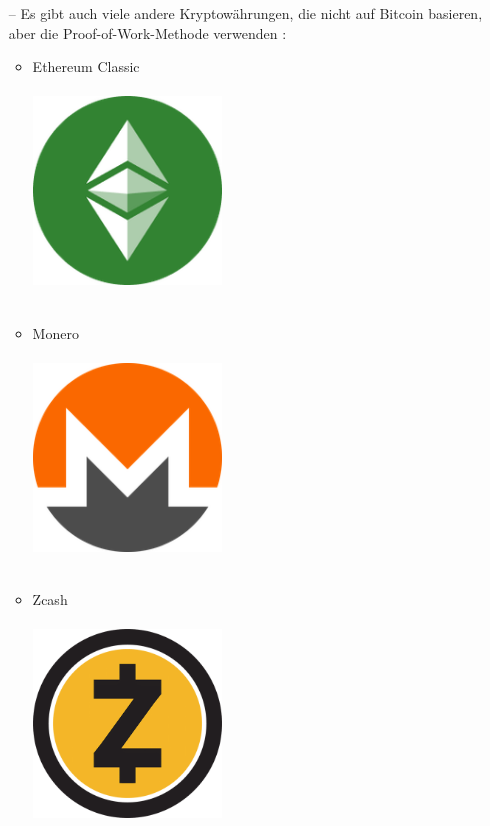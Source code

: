 \documentclass[ngerman]{scrreprt}
\begin{document}
\begin{itemize}
\begin{itemize}
	\end{itemize}
	
	\item[--] Es gibt auch viele andere Kryptowährungen, die nicht auf Bitcoin basieren, aber die Proof-of-Work-Methode verwenden :
	\begin{itemize}
		\item{Ethereum Classic}\\ \\
		\includegraphics[width=5cm,height=5cm]{ethereumclassic.png}\\ \\
		\item{Monero}\\ \\
		\includegraphics[width=5cm,height=5cm]{monero}\\ \\
		\item{Zcash}\\ \\
		\includegraphics[width=5cm,height=5cm]{zcash}\\ \\

\end{itemize}
\end{itemize}
\end{document}
